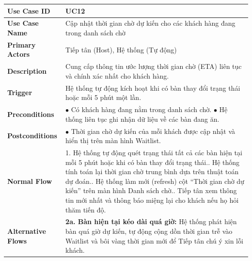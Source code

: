 \begin{longtable}{|p{3.5cm}|p{12.5cm}|}
\hline
\textbf{Use Case ID} & UC12 \\ \hline
\textbf{Use Case Name} & Cập nhật thời gian chờ dự kiến cho các khách hàng đang trong danh sách chờ \\ \hline
\textbf{Primary Actors} & Tiếp tân (Host), Hệ thống (Tự động) \\ \hline
\textbf{Description} & Cung cấp thông tin ước lượng thời gian chờ (ETA) liên tục và chính xác nhất cho khách hàng. \\ \hline
\textbf{Trigger} & Hệ thống tự động kích hoạt khi có bàn thay đổi trạng thái hoặc mỗi 5 phút một lần. \\ \hline
\textbf{Preconditions} &
$\bullet$ Có khách hàng đang nằm trong danh sách chờ.\newline
$\bullet$ Hệ thống liên tục ghi nhận dữ liệu về các bàn đang ăn. \\ \hline
\textbf{Postconditions} & $\bullet$ Thời gian chờ dự kiến của mỗi khách được cập nhật và hiển thị trên màn hình Waitlist. \\ \hline
\textbf{Normal Flow} &
1. Hệ thống tự động quét trạng thái tất cả các bàn hiện tại mỗi 5 phút hoặc khi có bàn thay đổi trạng thái.\newline
2. Hệ thống tính toán lại thời gian chờ trung bình dựa trên thuật toán dự đoán.\newline
3. Hệ thống làm mới (refresh) cột ``Thời gian chờ dự kiến'' trên màn hình Danh sách chờ.\newline
4. Tiếp tân xem thông tin mới nhất và thông báo miệng lại cho khách nếu họ hỏi thăm tiến độ. \\ \hline
\textbf{Alternative Flows} &
\textbf{2a. Bàn hiện tại kéo dài quá giờ:} Hệ thống phát hiện bàn quá giờ dự kiến, tự động cộng dồn thời gian trễ vào Waitlist và bôi vàng thời gian mới để Tiếp tân chú ý xin lỗi khách. \\ \hline
\end{longtable}

